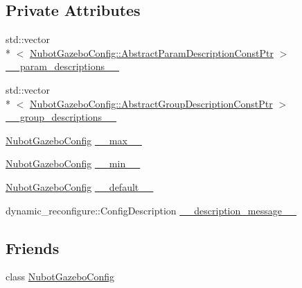 \subsection*{Private Attributes}
\begin{DoxyCompactItemize}
\item 
std\-::vector\\*
$<$ \hyperlink{classnubot__gazebo_1_1NubotGazeboConfig_a25b01b079fefa04f8d43df7d664dedac}{Nubot\-Gazebo\-Config\-::\-Abstract\-Param\-Description\-Const\-Ptr} $>$ \hyperlink{classnubot__gazebo_1_1NubotGazeboConfigStatics_af7c85af028b2c9a511e6435d6fde46a7}{\-\_\-\-\_\-param\-\_\-descriptions\-\_\-\-\_\-}
\item 
std\-::vector\\*
$<$ \hyperlink{classnubot__gazebo_1_1NubotGazeboConfig_aad0e4fda22f4c6a048f65a3de2f94c95}{Nubot\-Gazebo\-Config\-::\-Abstract\-Group\-Description\-Const\-Ptr} $>$ \hyperlink{classnubot__gazebo_1_1NubotGazeboConfigStatics_a9dff4b119d00cd564685931748c4268a}{\-\_\-\-\_\-group\-\_\-descriptions\-\_\-\-\_\-}
\item 
\hyperlink{classnubot__gazebo_1_1NubotGazeboConfig}{Nubot\-Gazebo\-Config} \hyperlink{classnubot__gazebo_1_1NubotGazeboConfigStatics_aa697aaaeff11cf06b26f6fd4faf03995}{\-\_\-\-\_\-max\-\_\-\-\_\-}
\item 
\hyperlink{classnubot__gazebo_1_1NubotGazeboConfig}{Nubot\-Gazebo\-Config} \hyperlink{classnubot__gazebo_1_1NubotGazeboConfigStatics_ae0a9d92649529c4e531367bb0fa952a0}{\-\_\-\-\_\-min\-\_\-\-\_\-}
\item 
\hyperlink{classnubot__gazebo_1_1NubotGazeboConfig}{Nubot\-Gazebo\-Config} \hyperlink{classnubot__gazebo_1_1NubotGazeboConfigStatics_a90c98043059ceee39be5423749278a5e}{\-\_\-\-\_\-default\-\_\-\-\_\-}
\item 
dynamic\-\_\-reconfigure\-::\-Config\-Description \hyperlink{classnubot__gazebo_1_1NubotGazeboConfigStatics_a3da58822615edf7212195ba35227ed74}{\-\_\-\-\_\-description\-\_\-message\-\_\-\-\_\-}
\end{DoxyCompactItemize}
\subsection*{Friends}
\begin{DoxyCompactItemize}
\item 
class \hyperlink{classnubot__gazebo_1_1NubotGazeboConfigStatics_ad2e42704cfd70b2287e2d4c2698576bb}{Nubot\-Gazebo\-Config}
\end{DoxyCompactItemize}


